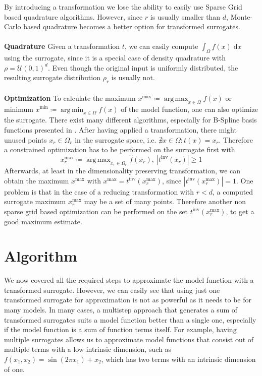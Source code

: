 \documentclass[
  a4paper,  %
  twoside,  %
  bibliography=totoc,
  headsepline,
  cleardoublepage=empty,
  parskip=half,
  draft=false
]{scrbook}
\DeclareMathOperator*{\argmin}{arg\,min}
\DeclareMathOperator*{\argmax}{arg\,max}
\begin{document}
By introducing a transformation we lose the ability to easily use Sparse Grid based quadrature algorithms.
However, since $r$ is usually smaller than $d$, Monte-Carlo based quadrature becomes a better option for transformed surrogates.
\\
\\
\textbf{Quadrature}
Given a transformation $t$, we can easily compute $\int_{\Omega} f(x) \; \text{d}x$ using the surrogate, since it is a special case of density quadrature with $\rho=\mathcal{U}(0,1)^d$.
Even though the original input is uniformly distributed, the resulting surrogate distribution $\rho_r$ is usually not.
\\
\\
\textbf{Optimization}
To calculate the maximum $x^\text{max} \coloneqq \argmax_{x \in \Omega} f(x)$ or minimum $x^\text{min} \coloneqq \argmin_{x \in \Omega} f(x)$ of the model function, one can also optimize the surrogate. There exist many different algorithms, especially for B-Spline basis functions presented in \cite{}.
After having applied a transformation, there might unused points $x_r \in \Omega_r$ in the surrogate space, i.e. $\nexists x \in \Omega \colon t(x)=x_r$.
Therefore a constrained optimization has to be performed on the surrogate first with
\begin{equation}
x_{r}^\text{max} \coloneqq \argmax_{x_r \in \Omega_r} \hat{f}(x_r), ~ |t^{\text{inv}}(x_{r})|\geq 1
\end{equation}
Afterwards, at least in the dimensionality preserving transformation, we can obtain the maximum $x^\text{max}$ with $x^\text{max}=t^{\text{inv}}(x_{r}^\text{max})$, since $|t^{\text{inv}}(x_{r}^\text{max})|=1$.
One problem is that in the case of a reducing transformation with $r<d$, a computed surrogate maximum $x_{r}^\text{max}$ may be a set of many points.
Therefore another non sparse grid based optimization can be performed on the set $t^{\text{inv}}(x_{r}^\text{max})$, to get a good maximum estimate.

\chapter{Algorithm}

We now covered all the required steps to approximate the model function with a transformed surrogate.
However, we can easily see that using just one transformed surrogate for approximation is not as powerful as it needs to be for many models.
In many cases, a multistep approach that generates a sum of transformed surrogates suits a model function better than a single one, especially if the model function is a sum of function terms itself.
For example, having multiple surrogates allows us to approximate model functions that consist out of multiple terms with a low intrinsic dimension, such as $f(x_1, x_2)=\sin(2 \pi x_1) + x_2$, which has two terms with an intrinsic dimension of one.
\end{document}
